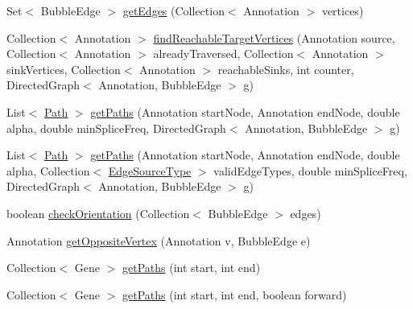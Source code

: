 \begin{DoxyCompactItemize}
\item 
Set$<$ Bubble\+Edge $>$ \hyperlink{classbroad_1_1pda_1_1seq_1_1graph_1_1_chromosome_with_bubbles_j_graph_t_ad1aa68a9922bef912e0641e7221cd2b2}{get\+Edges} (Collection$<$ Annotation $>$ vertices)
\item 
Collection$<$ Annotation $>$ \hyperlink{classbroad_1_1pda_1_1seq_1_1graph_1_1_chromosome_with_bubbles_j_graph_t_a5c3772f97a244c6bf2ff6f9e54667047}{find\+Reachable\+Target\+Vertices} (Annotation source, Collection$<$ Annotation $>$ already\+Traversed, Collection$<$ Annotation $>$ sink\+Vertices, Collection$<$ Annotation $>$ reachable\+Sinks, int counter, Directed\+Graph$<$ Annotation, Bubble\+Edge $>$ g)
\item 
List$<$ \hyperlink{classbroad_1_1pda_1_1seq_1_1graph_1_1_path}{Path} $>$ \hyperlink{classbroad_1_1pda_1_1seq_1_1graph_1_1_chromosome_with_bubbles_j_graph_t_a5e23cbd466e6e704ff6b426499c674fa}{get\+Paths} (Annotation start\+Node, Annotation end\+Node, double alpha, double min\+Splice\+Freq, Directed\+Graph$<$ Annotation, Bubble\+Edge $>$ g)
\item 
List$<$ \hyperlink{classbroad_1_1pda_1_1seq_1_1graph_1_1_path}{Path} $>$ \hyperlink{classbroad_1_1pda_1_1seq_1_1graph_1_1_chromosome_with_bubbles_j_graph_t_aaa73d80e64fde591be1675c3927c9caf}{get\+Paths} (Annotation start\+Node, Annotation end\+Node, double alpha, Collection$<$ \hyperlink{enumbroad_1_1pda_1_1seq_1_1graph_1_1_chromosome_with_bubbles_j_graph_t_1_1_edge_source_type}{Edge\+Source\+Type} $>$ valid\+Edge\+Types, double min\+Splice\+Freq, Directed\+Graph$<$ Annotation, Bubble\+Edge $>$ g)
\item 
boolean \hyperlink{classbroad_1_1pda_1_1seq_1_1graph_1_1_chromosome_with_bubbles_j_graph_t_ab57a595f55e990b71c2f71a86bec4043}{check\+Orientation} (Collection$<$ Bubble\+Edge $>$ edges)
\item 
Annotation \hyperlink{classbroad_1_1pda_1_1seq_1_1graph_1_1_chromosome_with_bubbles_j_graph_t_a25152ad6fcc6df9039f78c2b408fc717}{get\+Opposite\+Vertex} (Annotation v, Bubble\+Edge e)
\item 
Collection$<$ Gene $>$ \hyperlink{classbroad_1_1pda_1_1seq_1_1graph_1_1_chromosome_with_bubbles_j_graph_t_ad4e7ff19a4c900b15895711290ab4755}{get\+Paths} (int start, int end)
\item 
Collection$<$ Gene $>$ \hyperlink{classbroad_1_1pda_1_1seq_1_1graph_1_1_chromosome_with_bubbles_j_graph_t_ada55ff6fa49d59b321048b70b33b6d5f}{get\+Paths} (int start, int end, boolean forward)
\item 

\end{DoxyCompactItemize}
